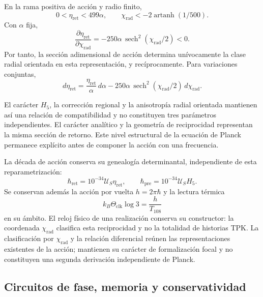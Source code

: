 En la rama positiva de acción y radio finito,
\begin{equation}
 0<\eta_{\mathrm{ret}}<499\alpha,\qquad
 \chi_{\mathrm{rad}}
 <-2\operatorname{artanh}(1/500).
 \label{md:restop:dominio-positivo}
\end{equation}
Con $\alpha$ fija,
\begin{equation}
 \frac{\partial\eta_{\mathrm{ret}}}{\partial\chi_{\mathrm{rad}}}
 =-250\alpha\,\operatorname{sech}^2(\chi_{\mathrm{rad}}/2)<0.
 \label{md:restop:derivada-accion}
\end{equation}
Por tanto, la sección adimensional de acción determina unívocamente la
clase radial orientada en esta representación, y recíprocamente.
Para variaciones conjuntas,
\begin{equation}
 d\eta_{\mathrm{ret}}
 =\frac{\eta_{\mathrm{ret}}}{\alpha}\,d\alpha
 -250\alpha\,\operatorname{sech}^2(\chi_{\mathrm{rad}}/2)
 \,d\chi_{\mathrm{rad}}.
 \label{md:restop:diferencial-accion}
\end{equation}

El carácter $H_5$, la corrección regional y la anisotropía radial orientada
mantienen así una relación de compatibilidad y no constituyen tres
parámetros independientes. El carácter analítico y la geometría de
reciprocidad representan la misma sección de retorno.
Este nivel estructural de la ecuación de Planck permanece explícito
antes de componer la acción con una frecuencia.

La década de acción conserva su genealogía determinantal, independiente
de esta reparametrización:
\begin{equation}
 \hbar_{\mathrm{ret}}
 =10^{-34}\mathcal U_S\eta_{\mathrm{ret}},\qquad
 \hbar_{\mathrm{pre}}=10^{-34}\mathcal U_SH_5.
 \label{md:restop:secciones-accion}
\end{equation}
Se conservan además la acción por vuelta $h=2\pi\hbar$ y la lectura
térmica
\begin{equation}
 k_B\Theta_{\mathrm{clk}}\log3=\frac{h}{T_{108}}
 \label{md:restop:lectura-termica}
\end{equation}
en su ámbito. El reloj físico de una realización conserva su constructor:
la coordenada $\chi_{\mathrm{rad}}$ clasifica esta reciprocidad y no la
totalidad de historias TPK. La clasificación por
$\chi_{\mathrm{rad}}$ y la relación diferencial reúnen las representaciones
existentes de la acción; mantienen su carácter de formalización focal y no
constituyen una segunda derivación independiente de Planck.

\subsection{Circuitos de fase, memoria y conservatividad}
\label{md:restop:conservatividad}

